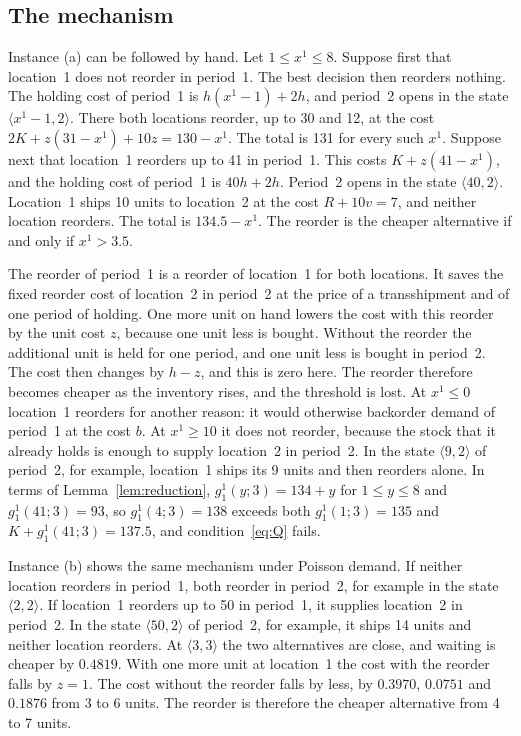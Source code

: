 \documentclass[11pt]{article}
\theoremstyle{definition}
\begin{document}
\subsection{The mechanism}

Instance (a) can be followed by hand. Let $1\le x^1\le8$. Suppose first that location~1 does not reorder in period~1. The best decision then reorders nothing. The holding cost of period~1 is $h(x^1-1)+2h$, and period~2 opens in the state $\langle x^1-1,2\rangle$. There both locations reorder, up to 30 and 12, at the cost $2K+z(31-x^1)+10z=130-x^1$. The total is 131 for every such $x^1$. Suppose next that location~1 reorders up to 41 in period~1. This costs $K+z(41-x^1)$, and the holding cost of period~1 is $40h+2h$. Period~2 opens in the state $\langle40,2\rangle$. Location~1 ships 10 units to location~2 at the cost $R+10v=7$, and neither location reorders. The total is $134.5-x^1$. The reorder is the cheaper alternative if and only if $x^1>3.5$.

The reorder of period~1 is a reorder of location~1 for both locations. It saves the fixed reorder cost of location~2 in period~2 at the price of a transshipment and of one period of holding. One more unit on hand lowers the cost with this reorder by the unit cost $z$, because one unit less is bought. Without the reorder the additional unit is held for one period, and one unit less is bought in period~2. The cost then changes by $h-z$, and this is zero here. The reorder therefore becomes cheaper as the inventory rises, and the threshold is lost. At $x^1\le0$ location~1 reorders for another reason: it would otherwise backorder demand of period~1 at the cost $b$. At $x^1\ge10$ it does not reorder, because the stock that it already holds is enough to supply location~2 in period~2. In the state $\langle9,2\rangle$ of period~2, for example, location~1 ships its 9 units and then reorders alone. In terms of Lemma~\ref{lem:reduction}, $g^1_1(y;3)=134+y$ for $1\le y\le8$ and $g^1_1(41;3)=93$, so $g^1_1(4;3)=138$ exceeds both $g^1_1(1;3)=135$ and $K+g^1_1(41;3)=137.5$, and condition~\eqref{eq:Q} fails.

Instance (b) shows the same mechanism under Poisson demand. If neither location reorders in period~1, both reorder in period~2, for example in the state $\langle2,2\rangle$. If location~1 reorders up to 50 in period~1, it supplies location~2 in period~2. In the state $\langle50,2\rangle$ of period~2, for example, it ships 14 units and neither location reorders. At $\langle3,3\rangle$ the two alternatives are close, and waiting is cheaper by $0.4819$. With one more unit at location~1 the cost with the reorder falls by $z=1$. The cost without the reorder falls by less, by $0.3970$, $0.0751$ and $0.1876$ from 3 to 6 units. The reorder is therefore the cheaper alternative from 4 to 7 units.
\end{document}
